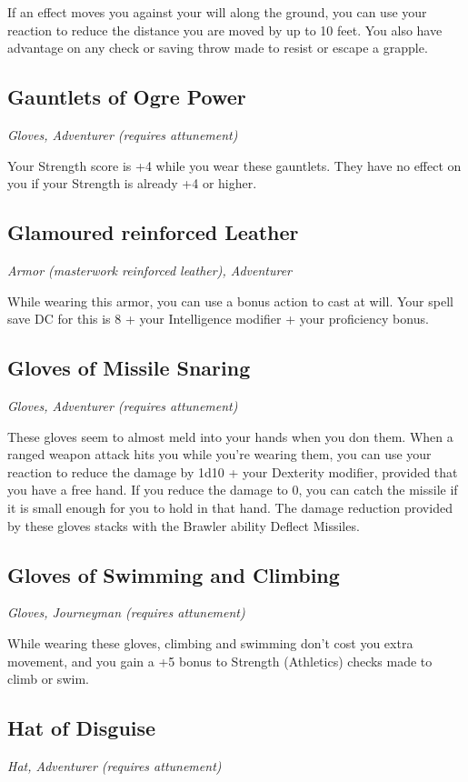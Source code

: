 If an effect moves you against your will along the ground, you can use your reaction to reduce the distance you are moved by up to 10 feet. You also have advantage on any check or saving throw made to resist or escape a grapple.

\subsection{Gauntlets of Ogre Power}
\textit{Gloves, Adventurer (requires attunement)}

Your Strength score is +4 while you wear these gauntlets. They have no effect on you if your Strength is already +4 or higher.

\subsection{Glamoured reinforced Leather}
\textit{Armor (masterwork reinforced leather), Adventurer}

While wearing this armor, you can use a bonus action to cast  at will. Your spell save DC for this is 8 + your Intelligence modifier + your proficiency bonus.

\subsection{Gloves of Missile Snaring}
\textit{Gloves, Adventurer (requires attunement)}

These gloves seem to almost meld into your hands when you don them. When a ranged weapon attack hits you while you're wearing them, you can use your reaction to reduce the damage by 1d10 + your Dexterity modifier, provided that you have a free hand. If you reduce the damage to 0, you can catch the missile if it is small enough for you to hold in that hand. The damage reduction provided by these gloves stacks with the Brawler ability Deflect Missiles.

\subsection{Gloves of Swimming and Climbing}
\textit{Gloves, Journeyman (requires attunement)}

While wearing these gloves, climbing and swimming don't cost you extra movement, and you gain a +5 bonus to Strength (Athletics) checks made to climb or swim.

\subsection{Hat of Disguise}
\textit{Hat, Adventurer (requires attunement)}

